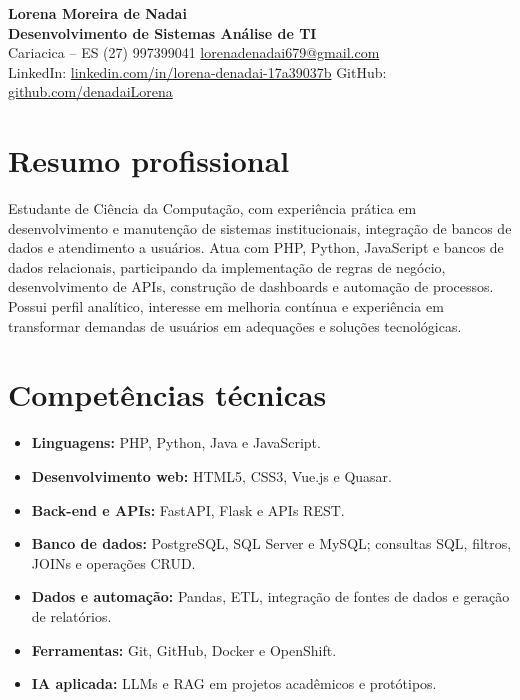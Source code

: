 \documentclass[10pt,a4paper]{article}
\begin{document}
{\LARGE\bfseries\color{accent} Lorena Moreira de Nadai}\\[-1pt]
{\normalsize\bfseries Desenvolvimento de Sistemas \textbar{} Análise de TI}\\[4pt]
{\small
Cariacica -- ES \textbar{} (27) 997399041 \textbar{} \href{mailto:lorenadenadai679@gmail.com}{lorenadenadai679@gmail.com}\\
LinkedIn: \href{https://www.linkedin.com/in/lorena-denadai-17a39037b}{linkedin.com/in/lorena-denadai-17a39037b}
\textbar{} GitHub: \href{https://github.com/denadaiLorena}{github.com/denadaiLorena}
}
\section*{Resumo profissional}
Estudante de Ciência da Computação, com experiência prática em desenvolvimento e manutenção de sistemas institucionais, integração de bancos de dados e atendimento a usuários. Atua com PHP, Python, JavaScript e bancos de dados relacionais, participando da implementação de regras de negócio, desenvolvimento de APIs, construção de dashboards e automação de processos. Possui perfil analítico, interesse em melhoria contínua e experiência em transformar demandas de usuários em adequações e soluções tecnológicas.
\section*{Competências técnicas}
\begin{itemize}
\item \textbf{Linguagens:} PHP, Python, Java e JavaScript.
\item \textbf{Desenvolvimento web:} HTML5, CSS3, Vue.js e Quasar.
\item \textbf{Back-end e APIs:} FastAPI, Flask e APIs REST.
\item \textbf{Banco de dados:} PostgreSQL, SQL Server e MySQL; consultas SQL, filtros, JOINs e operações CRUD.
\item \textbf{Dados e automação:} Pandas, ETL, integração de fontes de dados e geração de relatórios.
\item \textbf{Ferramentas:} Git, GitHub, Docker e OpenShift.
\item \textbf{IA aplicada:} LLMs e RAG em projetos acadêmicos e protótipos.
\end{itemize}
\end{document}
